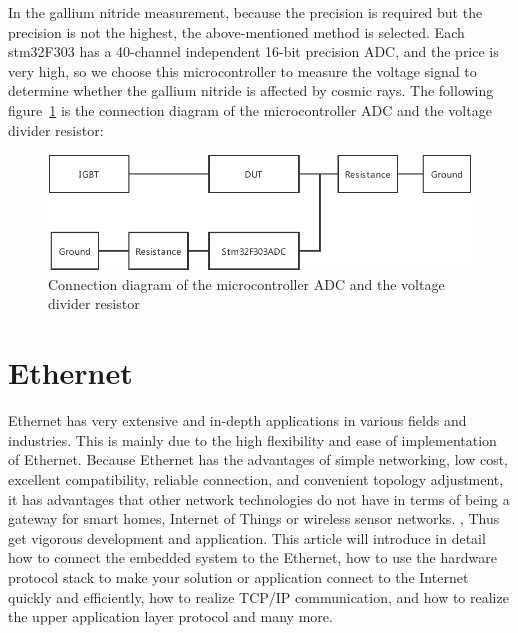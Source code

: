 In the gallium nitride measurement, because the precision is required but the precision is not the highest, the above-mentioned method is selected.
Each stm32F303 has a 40-channel independent 16-bit precision ADC, and the price is very high, so we choose this microcontroller to measure the voltage signal to determine whether the gallium nitride is affected by cosmic rays. The following figure~\ref{fig:2.5} is the connection diagram of the microcontroller ADC and the voltage divider resistor:
\begin{figure}[h]
	\centering
	\includegraphics[width=13cm]{grafiken/2.5.pdf}
	\caption{Connection diagram of the microcontroller ADC and the voltage divider resistor} 
	\label{fig:2.5}
\end{figure}
\section{Ethernet}
\label{sec:Ethernet}
Ethernet has very extensive and in-depth applications in various fields and industries. This is mainly due to the high flexibility and ease of implementation of Ethernet. Because Ethernet has the advantages of simple networking, low cost, excellent compatibility, reliable connection, and convenient topology adjustment, it has advantages that other network technologies do not have in terms of being a gateway for smart homes, Internet of Things or wireless sensor networks. , Thus get vigorous development and application. This article will introduce in detail how to connect the embedded system to the Ethernet, how to use the hardware protocol stack to make your solution or application connect to the Internet quickly and efficiently, how to realize TCP/IP communication, and how to realize the upper application layer protocol and many more.
